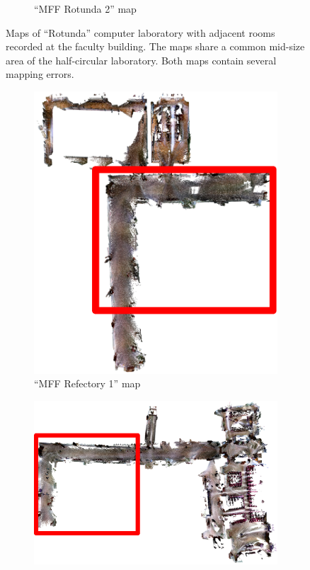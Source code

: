 \begin{figure}
\begin{subfigure}[b]{\textwidth}
        \caption{``MFF Rotunda 2'' map}
    \end{subfigure}
    \caption[MFF Rotunda maps]{Maps of ``Rotunda'' computer laboratory with adjacent rooms recorded at the faculty building. The maps share a common mid-size area of the half-circular laboratory. Both maps contain several mapping errors.}
    \label{fig:mff_rotunda}
\end{figure}

\begin{figure}
    \centering
    \begin{subfigure}[b]{0.65\textwidth}
        \includegraphics[width=\textwidth]{../img/mff_refectory_1_highlight.png}
        \caption{``MFF Refectory 1'' map}
    \end{subfigure}
    \begin{subfigure}[b]{\textwidth}
        \includegraphics[width=\textwidth]{../img/mff_refectory_2_highlight.png}

\end{subfigure}
\end{figure}
